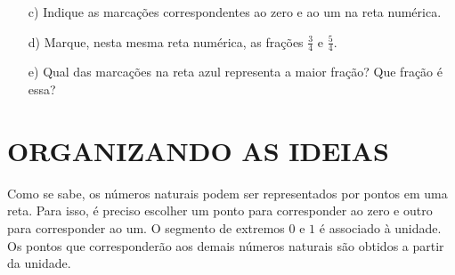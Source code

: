 \begin{atividade}{}
\begin{center}
\end{center}

\begin{enumerate}[\quad a)]
  \item[c)]     Indique as marcações correspondentes ao zero e ao um na reta numérica.
  \item[d)]     Marque, nesta mesma reta numérica, as frações     $\frac{3}{4}$     e     $\frac{5}{4}$.
    \item[e)] Qual das marcações na reta azul representa a maior fração? Que fração é essa?

\end{enumerate} %
\end{atividade}

\section{ORGANIZANDO AS IDEIAS }

Como se sabe, os números naturais podem ser representados por pontos em uma reta. Para isso, é preciso escolher um ponto para corresponder ao zero e outro para corresponder ao um. O segmento de extremos $0$ e $1$ é associado à unidade. Os pontos que corresponderão aos demais números naturais são obtidos a partir da unidade.

